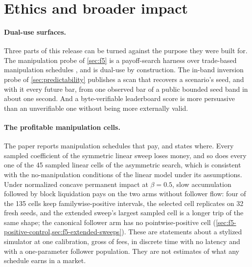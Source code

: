 \section{Ethics and broader impact}\label{sec:ethics}

\paragraph{Dual-use surfaces.} Three parts of this release can be turned against the purpose they were built for. The manipulation probe of \cref{sec:f5} is a payoff-search harness over trade-based manipulation schedules \citep{allen1992stock}, and is dual-use by construction. The in-band inversion probe of \cref{sec:predictability} publishes a scan that recovers a scenario's seed, and with it every future bar, from one observed bar of a public bounded seed band in about one second. And a byte-verifiable leaderboard score is more persuasive than an unverifiable one without being more externally valid.

\paragraph{The profitable manipulation cells.} The paper reports manipulation schedules that pay, and states where. Every sampled coefficient of the symmetric linear sweep loses money, and so does every one of the 45 sampled linear cells of the asymmetric search, which is consistent with the no-manipulation conditions of the linear model under its assumptions. Under normalized concave permanent impact at $\beta=0.5$, slow accumulation followed by block liquidation pays on the two arms without follower flow: four of the 135 cells keep familywise-positive intervals, the selected cell replicates on 32 fresh seeds, and the extended sweep's largest sampled cell is a longer trip of the same shape; the canonical follower arm has no pointwise-positive cell (\cref{sec:f5-positive-control,sec:f5-extended-sweeps}). These are statements about a stylized simulator at one calibration, gross of fees, in discrete time with no latency and with a one-parameter follower population. They are not estimates of what any schedule earns in a market.

